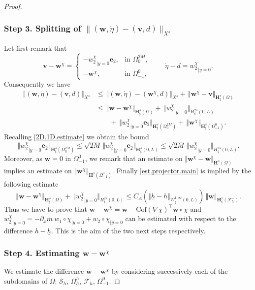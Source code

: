\documentclass[10pt]{amsart}
\let\mathcal\mathscr
\theoremstyle{remark}
\theoremstyle{definition}
\newcommand{\norme}[1]{\,\Vert #1\Vert}
\newcommand{\vnorme}[1]{\Vert #1\Vert}
\newcommand{\vg}{\boldsymbol{v}}
\newcommand{\wg}{\boldsymbol{w}}
\newcommand{\BS}[1]{\boldsymbol{#1}}
\let\CM\Omega
\newcommand{\etap}{\dot{\eta}}
\newcommand{\hb}{{\underline{h}}}
\newcommand{\Cof}{\mathrm{Cof}}
\begin{document}
\begin{proof}
\subsubsection*{Step 3. Splitting of $\|(\wg,\etap) - (\vg,d)\|_{X^s}$}
Let first remark that
\[\vg - \wg^\chi =\begin{cases}
-{w_{2}^\chi}_{|{y=0}}\BS{e}_{2},&\text{in } \Omega^{2M}_{0},\\
-\wg^\chi, & \text{in }\Omega^{0}_{-1},
\end{cases}
\qquad
\etap -d ={w_{2}^\chi}_{|{y=0}}.
\]
Consequently we have
\[
\begin{aligned}
\norme{(\wg,\etap) - (\vg,d)}_{X^s}&\leq \norme{(\wg,\etap) - (\wg^\chi,d)}_{X^s} +\norme{\wg^\chi - \vg}_{\BS{H}^{s}_{\sharp}(\CM)}\\
&\leq \norme{\wg -\wg^\chi}_{\BS{H}^{s}_{\sharp}(\CM)} + \norme{{w_{2}^\chi}_{|{y=0}}}_{H^{2s}_{\sharp}(0,L)} \\
& \qquad + \norme{{w_{2}^\chi}_{|{y=0}}\BS{e}_{2}}_{\BS{H}^{s}_{\sharp}(\Omega^{2M}_{0})}+\norme{\wg^\chi}_{\BS{H}^{s}_{\sharp}(\Omega_{-1}^{0})}.
\end{aligned}
\]
Recalling \eqref{2D.1D.estimate} we obtain the bound
\[\norme{{w_{2}^\chi}_{|{y=0}}\BS{e}_{2}}_{\BS{H}_\sharp^{s}(\Omega_{0}^{2M})}\leq \sqrt{2M}\norme{{w_{2}^\chi}_{|{y=0}}\BS{e}_{2}}_{\BS{H}_\sharp^{s}(0,L)}\leq \sqrt{2M}\norme{{w_{2}^\chi}_{|{y=0}}}_{H_\sharp^{2s}(0,L)}.\]
Moreover, as $\wg=0$ in $\Omega^{0}_{-1}$, we remark that an estimate on $\vnorme{\wg^\chi - \wg}_{\BS{H}^{s}(\CM)}$ implies an estimate on $\vnorme{\wg^\chi}_{\BS{H}^{s}(\Omega_{-1}^{0})}$. Finally \eqref{est.projector.main} is implied by the following estimate
\begin{equation}\label{est.projector.final}
\norme{\wg -\wg^\chi}_{\BS{H}^{s}_{\sharp}(\CM)}+ \norme{{w_{2}^\chi}_{|{y=0}}}_{H^{2s}_{\sharp}(0,L)}
\leq C_{A}(\vnorme{\hb -h }_{W^{1,\infty}_{\sharp}(0,L)})\norme{\wg}_{\BS{H}^{1}_{\sharp}(\mathcal{F}^{-}_{h})}.
\end{equation}
Thus we have to prove that $\wg -\wg^\chi=\wg-\Cof(\nabla \chi)^{\top}\wg\circ \chi $ and ${w_{2}^\chi}_{|{y=0}}=-\partial_x m \ w_{1}\circ\chi_{|{y=0}}+w_{2}\circ\chi_{|{y=0}}$ can be estimated with respect to the difference $h-\hb$. This is the aim of the two next steps respectively.

\subsubsection*{Step 4. Estimating $\wg -\wg^\chi$}
We estimate the difference $\wg - \wg^{\chi}$
by considering successively each of the subdomains of $\Omega$: $\mathcal{S}_{h}$, $\Omega_{\hb}^{h}$, $\mathcal{F}_{\hb}$, $\Omega_{-1}^{0}$.


\end{proof}
\end{document}
